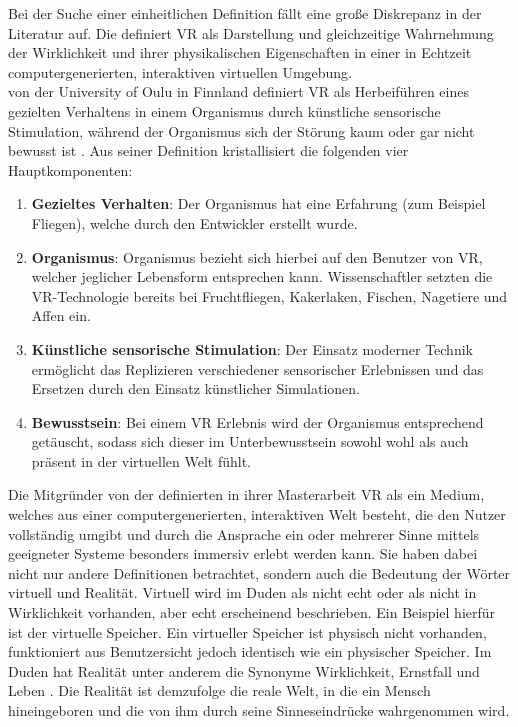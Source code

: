 Bei der Suche einer einheitlichen Definition fällt eine große Diskrepanz in der Literatur auf. Die \citeauthor{BundeszentralefurpolitischeBildung.2018} definiert \ac{VR} als \glqq Darstellung und gleichzeitige Wahrnehmung der Wirklichkeit und ihrer physikalischen Eigenschaften in einer in Echtzeit computergenerierten, interaktiven virtuellen Umgebung\grqq  \cite{BundeszentralefurpolitischeBildung.2018}. \\
\citeauthor{LaValle.2019} von der University of Oulu in Finnland definiert \ac{VR} als Herbeiführen eines gezielten Verhaltens in einem Organismus durch künstliche sensorische Stimulation, während der Organismus sich der Störung kaum oder gar nicht bewusst ist \cite{LaValle.2019}. Aus seiner Definition kristallisiert \citeauthor{LaValle.2019} die folgenden vier Hauptkomponenten:\cite{LaValle.2019}
\begin{enumerate}
	\item \textbf{Gezieltes Verhalten}: Der Organismus hat eine Erfahrung (zum Beispiel Fliegen), welche durch den Entwickler erstellt wurde. 
	\item \textbf{Organismus}: Organismus bezieht sich hierbei auf den Benutzer von \ac{VR}, welcher jeglicher Lebensform entsprechen kann. Wissenschaftler setzten die \ac{VR}-Technologie bereits bei Fruchtfliegen, Kakerlaken, Fischen, Nagetiere und Affen ein. 
	\item \textbf{Künstliche sensorische Stimulation}: Der Einsatz moderner Technik ermöglicht das Replizieren verschiedener sensorischer Erlebnissen und das Ersetzen durch den Einsatz künstlicher Simulationen. 
	\item \textbf{Bewusstsein}: Bei einem \acl{VR} Erlebnis wird der Organismus entsprechend getäuscht, sodass sich dieser im Unterbewusstsein sowohl wohl als auch präsent in der virtuellen Welt fühlt.
\end{enumerate}

Die Mitgründer von der   definierten in ihrer Masterarbeit \ac{VR} als \glqq ein Medium, welches aus einer computergenerierten, interaktiven Welt besteht, die den Nutzer vollständig umgibt und durch die Ansprache ein oder mehrerer Sinne mittels geeigneter Systeme besonders immersiv erlebt werden kann\grqq \cite{omnia.2017}. Sie haben dabei nicht nur andere Definitionen betrachtet, sondern auch die Bedeutung der Wörter virtuell und Realität. Virtuell wird im Duden als \glqq nicht echt \grqq \cite{DudenVirtuell} oder als \glqq nicht in Wirklichkeit vorhanden, aber echt erscheinend\grqq \cite{DudenVirtuell} beschrieben. Ein Beispiel hierfür ist der virtuelle Speicher. Ein virtueller Speicher ist physisch nicht vorhanden, funktioniert aus Benutzersicht jedoch identisch wie ein physischer Speicher. Im Duden hat Realität unter anderem die Synonyme Wirklichkeit, Ernstfall und Leben \cite{DudenRealitaet}. Die Realität ist demzufolge \glqq die reale Welt, in die ein Mensch hineingeboren und die von ihm durch seine Sinneseindrücke wahrgenommen wird\grqq \cite{omnia.2017}.

